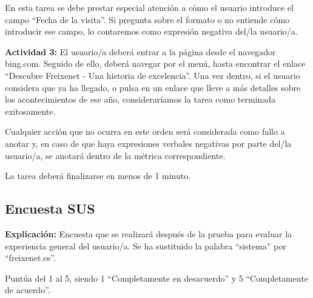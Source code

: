 \documentclass[spanish]{article}
\begin{document}
En esta tarea se debe prestar especial atención a cómo el
usuario introduce el campo ``Fecha de la visita''. Si pregunta
sobre el formato o no entiende cómo introducir ese campo, lo
contaremos como expresión negativa del/la usuario/a.\newline

\textbf{Actividad 3:} El usuario/a deberá entrar a la página
desde el navegador bing.com. Seguido de ello, deberá navegar
por el menú, hasta encontrar el enlace ``Descubre Freixenet -
Una historia de excelencia''. Una vez dentro, si el usuario
considera que ya ha llegado, o pulsa en un enlace que lleve
a más detalles sobre los acontecimientos de ese año,
consideraríamos la tarea como terminada
exitosamente.\newline

Cualquier acción que no ocurra en este orden será
considerada como fallo a anotar y, en caso de que haya
expresiones verbales negativas por parte del/la usuario/a,
se anotará dentro de la métrica correspondiente.\newline

La tarea deberá finalizarse en menos de 1 minuto.\newline

\newpage

\subsection{Encuesta SUS}

\textbf{Explicación:} Encuesta que se realizará después de la prueba
para evaluar la experiencia general del usuario/a. Se ha
sustituido la palabra ``sistema'' por ``freixenet.es''.\newline

Puntúa del 1 al 5, siendo 1 ``Completamente en desacuerdo'' y
5 ``Completamente de acuerdo''.\newline
\end{document}
